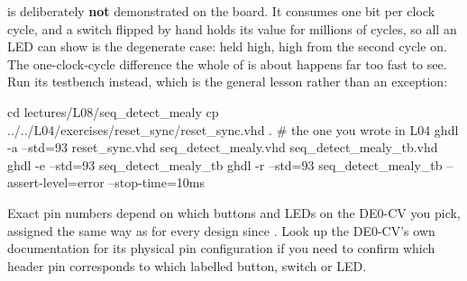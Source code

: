  is deliberately \textbf{not} demonstrated on the board. It consumes one bit
per clock cycle, and a switch flipped by hand holds its value for millions of cycles, so all an LED
can show is the degenerate case:  held high,  high from the second cycle on. The
one-clock-cycle difference the whole of  is about happens far too fast to see.
Run its testbench instead, which is the general lesson rather than an exception:

\begin{shell}
cd lectures/L08/seq_detect_mealy
cp ../../L04/exercises/reset_sync/reset_sync.vhd .     # the one you wrote in L04
ghdl -a --std=93 reset_sync.vhd seq_detect_mealy.vhd seq_detect_mealy_tb.vhd
ghdl -e --std=93 seq_detect_mealy_tb
ghdl -r --std=93 seq_detect_mealy_tb --assert-level=error --stop-time=10ms
\end{shell}

Exact pin numbers depend on which buttons and LEDs on the DE0-CV you pick, assigned the same way as
for every design since . Look up the DE0-CV's own documentation for its physical pin
configuration if you need to confirm which header pin corresponds to which labelled button, switch
or LED.
